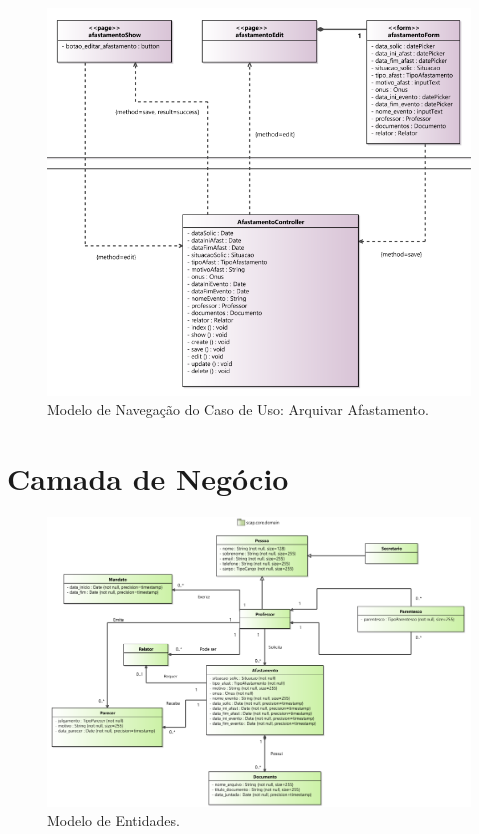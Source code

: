 \begin{figure}[h]
	\centering
	\includegraphics[width=1\textwidth]{figuras/figura-arquitetura-navegacao2.png}
	\caption{Modelo de Navegação do Caso de Uso: Arquivar Afastamento.}
	\label{figura-arquitetura-navegacao2}
\end{figure}

\section{Camada de Negócio}
\label{sec-arquitetura-negocio}


\begin{figure}[h]
	\centering
	\includegraphics[width=1\textwidth]{figuras/figura-arquitetura-entidade.png}
	\caption{Modelo de Entidades.}
	\label{figura-arquitetura-entidade}
\end{figure}

